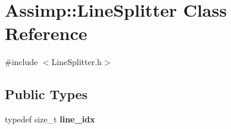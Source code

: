\hypertarget{class_assimp_1_1_line_splitter}{\section{Assimp\+:\+:Line\+Splitter Class Reference}
\label{class_assimp_1_1_line_splitter}
}


{\ttfamily \#include $<$Line\+Splitter.\+h$>$}

\subsection*{Public Types}
\begin{DoxyCompactItemize}
\item 
\hypertarget{class_assimp_1_1_line_splitter_aef56da1bb83d87c439d181cbce523068}{typedef size\+\_\+t {\bfseries line\+\_\+idx}}\label{class_assimp_1_1_line_splitter_aef56da1bb83d87c439d181cbce523068}

\end{DoxyCompactItemize}
